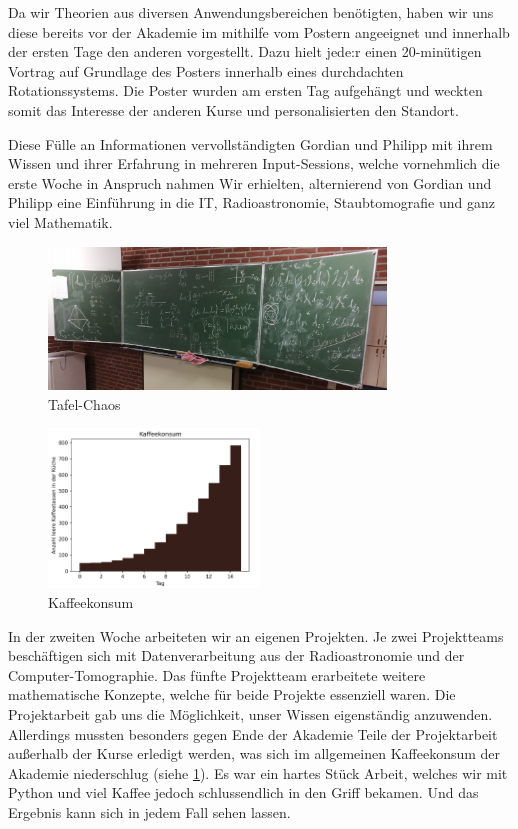 Da wir Theorien aus diversen Anwendungsbereichen benötigten, haben wir uns diese bereits vor der Akademie im mithilfe vom Postern angeeignet und innerhalb der ersten Tage den anderen vorgestellt.
Dazu hielt jede:r einen 20-minütigen Vortrag auf Grundlage des Posters innerhalb eines durchdachten Rotationssystems.
Die Poster wurden am ersten Tag aufgehängt und weckten somit das Interesse der anderen Kurse und personalisierten den Standort.

Diese Fülle an Informationen vervollständigten Gordian und Philipp mit ihrem Wissen und ihrer Erfahrung in mehreren Input-Sessions, welche vornehmlich die erste Woche in Anspruch nahmen
Wir erhielten, alternierend von Gordian und Philipp eine Einführung in die IT, Radioastronomie, Staubtomografie und ganz viel Mathematik.

\begin{figure}
    \centering
    \includegraphics[width=0.8\textwidth]{k4.2/tafelbild.png}
    \caption{Tafel-Chaos}
\end{figure}

\begin{figure}
    \centering
	\includegraphics[width=0.5\textwidth]{k4.2/kaffee.png}
	\caption{Kaffeekonsum}
    \label{k4.2.fig.kaffee}
\end{figure}

In der zweiten Woche arbeiteten wir an eigenen Projekten.
Je zwei Projektteams beschäftigen sich mit Datenverarbeitung aus der Radioastronomie und der Computer-Tomographie.
Das fünfte Projektteam erarbeitete weitere mathematische Konzepte, welche für beide Projekte essenziell waren.
Die Projektarbeit gab uns die Möglichkeit, unser Wissen eigenständig anzuwenden.
Allerdings mussten besonders gegen Ende der Akademie Teile der Projektarbeit außerhalb der Kurse erledigt werden, was sich im allgemeinen Kaffeekonsum der Akademie niederschlug (siehe \cref{k4.2.fig.kaffee}).
Es war ein hartes Stück Arbeit, welches wir mit Python und viel Kaffee jedoch schlussendlich in den Griff bekamen.
Und das Ergebnis kann sich in jedem Fall sehen lassen.
